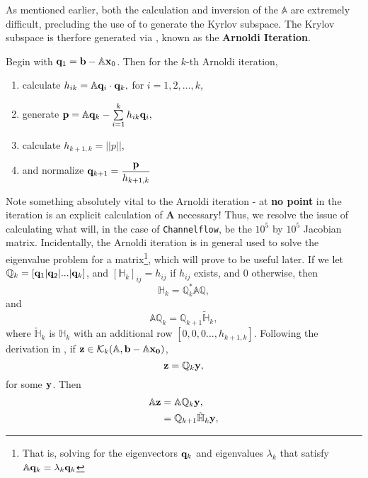 As mentioned earlier, both the calculation and inversion of the $\mathbb{A}$ are extremely difficult, precluding the use of  to generate the Kyrlov subspace. The Krylov subspace is therfore generated via , known as the {\bf Arnoldi Iteration}. 
\begin{algorithm}\label{alg:Arnoldi}
Begin with $\mathbf{q}_1 = \mathbf{b} - \mathbb{A}\mathbf{x}_0$. Then for the $k$-th Arnoldi iteration,
\begin{enumerate}
\item calculate $h_{ik} = \mathbb{A}\mathbf{q}_{i} \cdot \mathbf{q}_k,$ for $i = 1,2,...,k$,
\item generate $\Vector{p} = \mathbb{A}\Vector{q}_k - \sum{i=1}{k}{h_{ik}\Vector{q}_i},$ 
\item calculate $h_{k+1,k} = ||p||$,
\item and normalize $\mathbf{q}_{k+1} = \dfrac{\mathbf{p}}{h_{k+1,k}}$
\end{enumerate}
\end{algorithm}
Note something absolutely vital to the Arnoldi iteration - at {\bf no point} in the iteration is an explicit calculation of $\mathbf{A}$ necessary! Thus, we resolve the issue of calculating what will, in the case of {\tt Channelflow}, be the $10^5$ by $10^5$ Jacobian matrix.  Incidentally, the Arnoldi iteration is in general used to solve the eigenvalue problem for a matrix\footnote{That is, solving for the eigenvectors $\mathbf{q}_k$ and eigenvalues $\lambda_k$ that satisfy $\mathbb{A}\mathbf{q}_k = \lambda_k\mathbf{q}_k$}, which will prove to be useful later. If we let $\mathbb{Q}_k = [ \mathbf{q}_1| \mathbf{q}_2 | ... |\mathbf{q}_k ]$, and $[\mathbb{H}_k]_{ij} = h_{ij}$ if $h_{ij}$ exists, and $0$ otherwise, then 
\begin{equation}
\mathbb{H}_k = \mathbb{Q}_k^* \mathbb{A}\mathbb{Q},
\end{equation}
and 
\begin{equation}\label{eq:Qiter}
\mathbb{A}\mathbb{Q}_k = \mathbb{Q}_{k+1}\mathbb{\tilde{H}}_k,
\end{equation}
where $\mathbb{\tilde{H}}_k$ is $\mathbb{H}_k$ with an additional row $[0,0,0...,h_{k+1,k}]$. Following the derivation in , if $\mathbf{z} \in \mathcal{K}_k(\mathbb{A},{\mathbf{b}-\mathbb{A}\mathbf{x_0}})$, 
\begin{equation}
\mathbf{z} = \mathbb{Q}_k \mathbf{y},
\end{equation}
for some $\mathbf{y}$. Then 
\begin{align}
\begin{split}
\mathbb{A}\mathbf{z} &= \mathbb{A}\mathbb{Q}_{k}\mathbf{y},\\
				&= \mathbb{Q}_{k+1}\mathbb{\tilde{H}}_{k}\mathbf{y},
\end{split}
\end{align}
